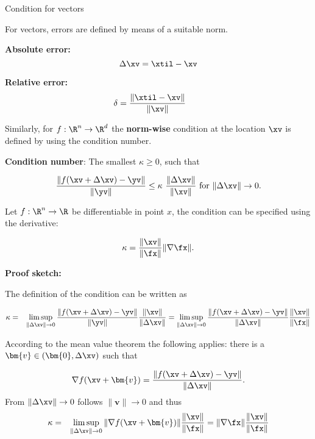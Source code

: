 \documentclass[11pt,compress,t,notes=noshow, xcolor=table]{beamer}
\begin{document}
\begin{vbframe}{Condition for vectors}

For vectors, errors are defined by means of a suitable norm.

\lz

\textbf{Absolute error:}
$$
  \Delta \xv = \xtil - \xv
$$

\textbf{Relative error:}
$$
  \delta = \frac{\|\xtil - \xv \|}{\|\xv\|} \qquad
$$

Similarly, for $f:\R^n \rightarrow \R^d$ the \textbf{norm-wise} condition at the location $\xv$ is defined by using the condition number.

\lz

%

\textbf{Condition number}: The smallest $\kappa \geq 0$, such that

$$
\frac{\|f(\xv+\Delta \xv)-\yv\|}{\|\yv\|} \leq \kappa \ \frac{\|\Delta \xv\|}{\|\xv\|} \text{ for } \|\Delta \xv\| \to 0.
$$

Let $f: \R^n \to \R$ be differentiable in point $x$, the condition can be specified using the derivative:

\vspace*{-.3cm}
$$
\kappa =  \frac{\|\xv\|}{\|\fx\|} \|\nabla \fx\|.
$$

\lz
\vspace*{0.5cm}
\begin{footnotesize}
\textbf{Proof sketch:}

The definition of the condition can be written as

\vspace*{-.3cm}
\begin{eqnarray*}
\kappa &=& \limsup_{\|\Delta \xv\| \to 0} \frac{\|f(\xv + \Delta \xv)-\yv\|}{\|\yv\|} \frac{\|\xv\|}{\|\Delta \xv\|}  = \limsup_{\|\Delta \xv\|\to 0} \frac{\|f(\xv + \Delta \xv)-\yv\|}{\|\Delta \xv\|} \frac{\|\xv\|}{\|\fx\|} 
\end{eqnarray*}

According to the mean value theorem the following applies: there is a $\bm{v} \in (\bm{0}, \Delta \xv)$ such that

$$
\nabla f(\xv + \bm{v}) = \frac{\|f(\xv + \Delta \xv)-\yv\|}{\|\Delta \xv\|}.
$$
\vspace*{0.5cm}
From $\|\Delta \xv\| \to 0$ follows $\|\bm{v}\|\to 0$ and thus
\begin{eqnarray*}
\kappa &=& \limsup_{\|\Delta \xv\| \to 0} \|\nabla f(\xv + \bm{v})\| \frac{\|\xv\|}{\|\fx\|} = \|\nabla \fx\| \frac{\|\xv\|}{\|\fx\|}
\end{eqnarray*}
\end{footnotesize}



\end{vbframe}
\end{document}
